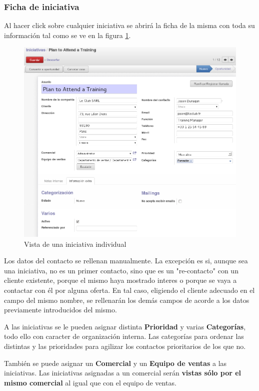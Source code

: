 \subsubsection{Ficha de iniciativa}

Al hacer click sobre cualquier iniciativa se abrirá la ficha de la misma con toda su información tal como se ve en la figura 
\ref{ven:iniindividual}.

\begin{figure}[H]
\includegraphics[width=\textwidth]{ventas/img/ven_iniindividual.png}
\caption{Vista de una iniciativa individual}
\label{ven:iniindividual}
\end{figure}

Los datos del contacto se rellenan manualmente. La excepción es si, aunque sea una iniciativa, no es un primer contacto, sino que es un "re-contacto" con un cliente existente, porque el mismo haya mostrado interes o porque se vaya a contactar con él por alguna oferta. En tal caso, eligiendo el cliente adecuado en el campo del mismo nombre, se rellenarán los demás campos de acorde a los datos previamente introducidos del mismo.

A las iniciativas se le pueden asignar distinta \textbf{Prioridad} y varias \textbf{Categorías}, todo ello con caracter de organización interna. Las categorías para ordenar las distintas y las prioridades para agilizar los contactos prioritarios de los que no.

También se puede asignar un \textbf{Comercial} y un \textbf{Equipo de ventas} a las iniciativas. Las iniciativas asignadas a un comercial serán \textbf{vistas sólo por el mismo comercial} al igual que con el equipo de ventas.


